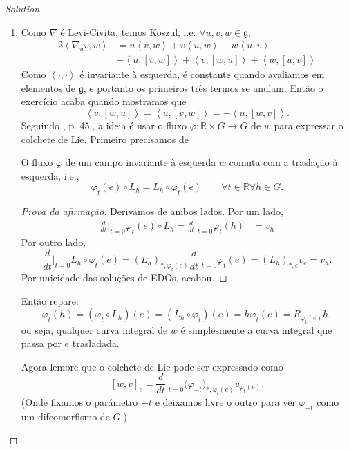 \begin{proof}[Solution]\leavevmode
\begin{enumerate}[label=(\alph*)]
\item Como \(\nabla\) é Levi-Civita, temos Koszul, i.e. \(\forall  u,v,w \in \mathfrak{g}\),
	\begin{align*}
	2\left<\nabla_uv,w\right>&=u\left<v,w\right>+v\left<u,w\right>-w\left<u,v\right>\\
				 & -\left<u,[v,w]\right>+\left<v,[w,u]\right>+\left<w,[u,v]\right>
	\end{align*}
	Como \(\left<\cdot,\cdot\right>\) é invariante à esquerda, é constante quando avaliamos em elementos de \(\mathfrak{g}\), e portanto os primeiros três termos se anulam. Então o exercício acaba quando mostramos que
	\[\left<v,[w,u]\right>=\left<u,[v,w]\right>=-\left<u,[w,v]\right>.\]
	Seguindo \cite{doc}, p. 45., a ideia é usar o fluxo \(\varphi:\mathbb{R} \times G\to G\) de \(w\) para expressar o colchete de Lie. Primeiro precisamos de

	\begin{claim}\leavevmode
	O fluxo \(\varphi\) de um campo invariante à esquerda \(w\) comuta com a traslação à esquerda, i.e.,
	\[\varphi_t(e)\circ L_h = L_h \circ \varphi_t(e)\qquad \forall t\in \mathbb{R} \forall h \in G.\]
	\end{claim}
	\begin{proof}[Prova da afirmação]\leavevmode
Derivamos de ambos lados. Por um lado,
\begin{align*}
\frac{d}{dt}\Big|_{t=0}\varphi_t(e) \circ L_h=\frac{d}{dt}\Big|_{t=0}\varphi_t(h)&=v_h\end{align*}
Por outro lado,
\[\frac{d}{dt}\Big|_{t=0}L_h \circ \varphi_t(e)=(L_h)_{*,\varphi_t(e)}\frac{d}{dt}\Big|_{t=0}\varphi_t(e)=(L_h)_{*,e}v_e=v_h.\]
Por unicidade das soluções de EDOs, acabou.
	\end{proof}
Então repare:
\[\varphi_t(h)=(\varphi_t\circ L_h)(e)=(L_h \circ \varphi_t)(e)=h\varphi_t(e)=R_{\varphi_t(e)}h,\]
ou seja, qualquer curva integral de \(w\) é simplesmente a curva integral que passa por \(e\) trasladada.

Agora lembre que o colchete de Lie pode ser expressado como
\[[w,v]_e=\frac{d}{dt}\Big|_{t=0}\Big(\varphi_{-t}\Big)_{*,\varphi_t(e)}v_{\varphi_t(e)}.\]
(Onde fixamos o parámetro \(-t\) e deixamos livre o outro para ver \(\varphi_{-t}\) como um difeomorfismo de \(G\).)


\end{enumerate}
\end{proof}

